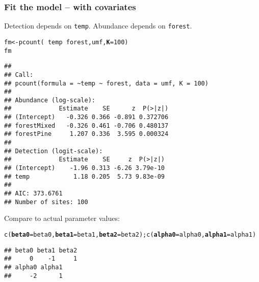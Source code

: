 \documentclass[color=usenames,dvipsnames]{beamer}\usepackage[]{graphicx}\usepackage[]{xcolor}
\makeatletter
\newcommand{\hlnum}[1]{\textcolor[rgb]{0.69,0.494,0}{#1}}%
\newcommand{\hlopt}[1]{\textcolor[rgb]{0,0,0}{#1}}%
\newcommand{\hldef}[1]{\textcolor[rgb]{0,0,0}{#1}}%
\newcommand{\hlkwb}[1]{\textcolor[rgb]{0,0.341,0.682}{#1}}%
\newcommand{\hlkwc}[1]{\textcolor[rgb]{0,0,0}{\textbf{#1}}}%
\newcommand{\hlkwd}[1]{\textcolor[rgb]{0.004,0.004,0.506}{#1}}%
\newenvironment{kframe}{%
 \def\at@end@of@kframe{}%
 \ifinner\ifhmode%
  \def\at@end@of@kframe{\end{minipage}}%
  \begin{minipage}{\columnwidth}%
 \fi\fi%
 \def\FrameCommand##1{\hskip\@totalleftmargin \hskip-\fboxsep
 \colorbox{shadecolor}{##1}\hskip-\fboxsep
     \hskip-\linewidth \hskip-\@totalleftmargin \hskip\columnwidth}%
 \MakeFramed {\advance\hsize-\width
   \@totalleftmargin\z@ \linewidth\hsize
   \@setminipage}}%
 {\par\unskip\endMakeFramed%
 \at@end@of@kframe}
\newenvironment{knitrout}{}{} %
\makeatother
\begin{document}
\begin{frame}[fragile]
  \frametitle{Fit the model -- with covariates}
  \footnotesize
  Detection depends on {\tt temp}. Abundance depends on {\tt forest}.
\begin{knitrout}\tiny
{}\color{fgcolor}\begin{kframe}
\begin{alltt}
\hldef{fm} \hlkwb{<-} \hlkwd{pcount}\hldef{(}\hlopt{~}\hldef{temp} \hlopt{~}\hldef{forest, umf,} \hlkwc{K}\hldef{=}\hlnum{100}\hldef{)}
\hldef{fm}
\end{alltt}
\begin{verbatim}
## 
## Call:
## pcount(formula = ~temp ~ forest, data = umf, K = 100)
## 
## Abundance (log-scale):
##             Estimate    SE      z  P(>|z|)
## (Intercept)   -0.326 0.366 -0.891 0.372706
## forestMixed   -0.326 0.461 -0.706 0.480137
## forestPine     1.207 0.336  3.595 0.000324
## 
## Detection (logit-scale):
##             Estimate    SE     z  P(>|z|)
## (Intercept)    -1.96 0.313 -6.26 3.79e-10
## temp            1.18 0.205  5.73 9.83e-09
## 
## AIC: 373.6761 
## Number of sites: 100
\end{verbatim}
\end{kframe}
\end{knitrout}
\pause
\vfill
Compare to actual parameter values:
\begin{knitrout}\tiny
{}\color{fgcolor}\begin{kframe}
\begin{alltt}
\hlkwd{c}\hldef{(}\hlkwc{beta0}\hldef{=beta0,} \hlkwc{beta1}\hldef{=beta1,} \hlkwc{beta2}\hldef{=beta2);} \hlkwd{c}\hldef{(}\hlkwc{alpha0}\hldef{=alpha0,} \hlkwc{alpha1}\hldef{=alpha1)}
\end{alltt}
\begin{verbatim}
## beta0 beta1 beta2 
##     0    -1     1
## alpha0 alpha1 
##     -2      1
\end{verbatim}
\end{kframe}
\end{knitrout}
\end{frame}
\end{document}
